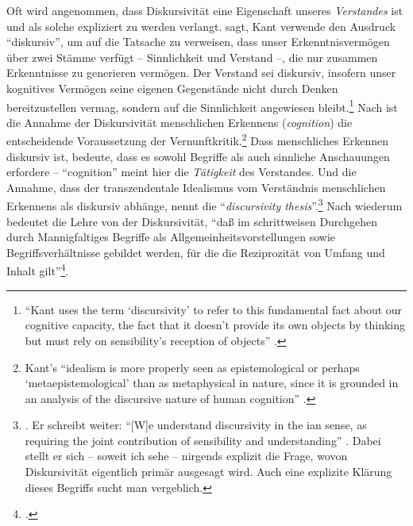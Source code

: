 Oft wird angenommen, dass Diskursivität eine Eigenschaft unseres
\emph{Verstandes} ist und als solche expliziert zu werden
verlangt.  sagt, Kant
verwende den Ausdruck \enquote{diskursiv}, um auf die Tatsache zu verweisen,
dass unser Erkenntnisvermögen über zwei Stämme verfügt -- Sinnlichkeit  und
Verstand --, die nur zusammen Erkenntnisse zu generieren vermögen. Der Verstand
sei diskursiv, insofern unser kognitives Vermögen seine eigenen Gegenstände
nicht durch Denken bereitzustellen vermag, sondern auf die Sinnlichkeit angewiesen
bleibt.\footnote{\enquote{Kant uses the term \enquote{discursivity} to refer to
this fundamental fact about our cognitive capacity, the fact that it doesn't
provide its own objects by thinking but must rely on sensibility's reception of
objects} \parencite[][143]{Quarfood:DiscursivityandTranscendentalIdealism2012}.}
Nach  ist die Annahme der
Diskursivität menschlichen Erkennens (\emph{cognition}) die entscheidende
Voraussetzung der Vernunftkritik.\footnote{Kant’s \enquote{idealism is more
properly seen as epistemological or perhaps \enquote{metaepistemological} than
as metaphysical in nature, since it is grounded in an analysis of the discursive
nature of human cognition}
\parencite[][4]{Allison:KantsTranscendentalIdealism2004}.} Dass menschliches
Erkennen diskursiv ist, bedeute, dass es sowohl Begriffe als auch sinnliche
Anschauungen erfordere -- \enquote{cognition} meint hier die
\emph{Tätigkeit} des Verstandes. Und die Annahme, dass der transzendentale
Idealismus vom Verständnis menschlichen Erkennens als diskursiv abhänge, nennt
 die
\enquote{\emph{discursivity
thesis}}.\footnote{\cite[Siehe][12]{Allison:KantsTranscendentalIdealism2004}.
Er schreibt weiter: \enquote{[W]e understand discursivity in the
ian sense, as requiring the joint contribution of
sensibility and understanding}
\parencite[][13]{Allison:KantsTranscendentalIdealism2004}. Dabei stellt er sich
-- soweit ich sehe -- nirgends explizit die Frage, wovon Diskursivität
eigentlich primär ausgesagt wird. Auch eine explizite Klärung dieses Begriffs
sucht man vergeblich.} Nach
 wiederum bedeutet die
Lehre von der Diskursivität, \enquote{daß im schrittweisen Durchgehen durch
Mannigfaltiges Begriffe als Allgemeinheitsvorstellungen sowie
Begriffsverhältnisse gebildet werden, für die die Reziprozität von Umfang und
Inhalt gilt}\footnote{\cite[][103]{Duesing:SpontanediskursiveSynthesis2004}.}.

